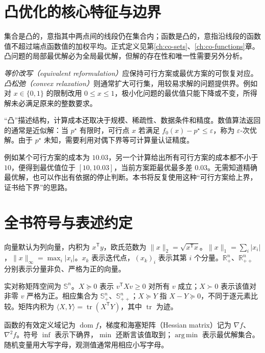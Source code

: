 \section{凸优化的核心特征与边界}

集合是凸的，意指其中两点间的线段仍在集合内；函数是凸的，意指沿线段的函数值不超过端点函数值的加权平均。正式定义见第\ref{ch:co-sets}、\ref{ch:co-functions}章。凸问题的局部最优解必为全局最优解，但解的存在性和唯一性需要另外分析。

\emph{等价改写（equivalent reformulation）}应保持可行方案或最优方案的可恢复对应。\emph{凸松弛（convex relaxation）}则通常扩大可行集，用较易求解的问题提供界。例如对 $x\in\{0,1\}$ 的限制改用 $0\leq x\leq1$，极小化问题的最优值只能下降或不变，所得解未必满足原来的整数要求。

“凸”描述结构，计算成本还取决于规模、稀疏性、数据条件和精度。数值算法返回的通常是近似解：当 $p^\star$ 有限时，可行点 $x$ 若满足 $f_0(x)-p^\star\leq\varepsilon$，称为 $\varepsilon$-次优解。由于 $p^\star$ 未知，需要利用对偶下界等可计算量认证精度。

例如某个可行方案的成本为 $10.03$，另一个计算给出所有可行方案的成本都不小于 $10$，便得到最优值位于 $[10,10.03]$，当前方案距最优最多差 $0.03$。无需知道精确最优解，也可以作出有依据的停止判断。本书将反复使用这种“可行方案给上界，证书给下界”的思路。

\section{全书符号与表述约定}

向量默认为列向量，内积为 $x^{\mathsf T}y$，欧氏范数为 $\|x\|_2=\sqrt{x^{\mathsf T}x}$。$\|x\|_1=\sum_i|x_i|$，$\|x\|_\infty=\max_i|x_i|$。$x_k$ 表示迭代点，$(x_k)_i$ 表示其第 $i$ 个分量。$\mathbb R_+^n$、$\mathbb R_{++}^n$ 分别表示分量非负、严格为正的向量。

实对称矩阵空间为 $\mathbb S^n$。$X\succeq0$ 表示 $v^{\mathsf T}Xv\geq0$ 对所有 $v$ 成立；$X\succ0$ 表示该值对非零 $v$ 严格为正。相应集合为 $\mathbb S_+^n$、$\mathbb S_{++}^n$；$X\succeq Y$ 指 $X-Y\succeq0$，不同于逐元素比较。矩阵内积为 $\langle X,Y\rangle=\operatorname{tr}(X^{\mathsf T}Y)$，其中 $\operatorname{tr}$ 为迹。

函数的有效定义域记为 $\operatorname{dom}f$，梯度和海塞矩阵（Hessian matrix）记为 $\nabla f$、$\nabla^2f$。符号 $\inf$ 表示下确界，$\min$ 还断言该值取到；$\operatorname{arg\,min}$ 表示最优解集合。随机变量用大写字母，观测值通常用相应小写字母。

